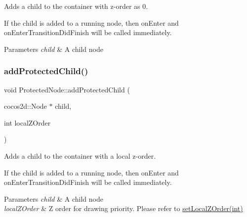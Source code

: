 Adds a child to the container with z-\/order as 0.

If the child is added to a \textquotesingle{}running\textquotesingle{} node, then \textquotesingle{}on\+Enter\textquotesingle{} and \textquotesingle{}on\+Enter\+Transition\+Did\+Finish\textquotesingle{} will be called immediately.


\begin{DoxyParams}{Parameters}
{\em child} & A child node \\
\hline
\end{DoxyParams}
\mbox{\label{classProtectedNode_a9f7688935e62904baacae03e8f2c2070}} 
\subsubsection{\texorpdfstring{add\+Protected\+Child()}{addProtectedChild()}\hspace{0.1cm}{\footnotesize\ttfamily [3/6]}}
{\footnotesize\ttfamily void Protected\+Node\+::add\+Protected\+Child (\begin{DoxyParamCaption}\item[{cocos2d\+::\+Node $\ast$}]{child,  }\item[{int}]{local\+Z\+Order }\end{DoxyParamCaption})\hspace{0.3cm}{\ttfamily [virtual]}}

Adds a child to the container with a local z-\/order.

If the child is added to a \textquotesingle{}running\textquotesingle{} node, then \textquotesingle{}on\+Enter\textquotesingle{} and \textquotesingle{}on\+Enter\+Transition\+Did\+Finish\textquotesingle{} will be called immediately.


\begin{DoxyParams}{Parameters}
{\em child} & A child node \\
\hline
{\em local\+Z\+Order} & Z order for drawing priority. Please refer to {\ttfamily \hyperlink{classNode_aee4e616c2d55b722226aae1e68b4946f}{set\+Local\+Z\+Order(int)}} \\
\hline
\end{DoxyParams}
\mbox{\label{classProtectedNode_acb1ea1deb4ab6e3bb46fd0947fef1d8b}} 

